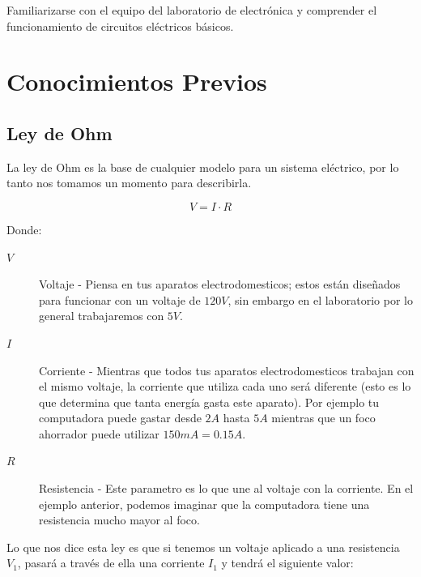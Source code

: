 	Familiarizarse con el equipo del laboratorio de electrónica y comprender el funcionamiento de circuitos eléctricos básicos.


\section{Conocimientos Previos}


	\subsection{Ley de Ohm}

		La ley de Ohm es la base de cualquier modelo para un sistema eléctrico, por lo tanto nos tomamos un momento para describirla.

		\begin{equation}
			V = I \cdot R
		\end{equation}

		Donde:

		\begin{description}
			\item[$V$] Voltaje - Piensa en tus aparatos electrodomesticos; estos están diseñados para funcionar con un voltaje de $120 V$, sin embargo en el laboratorio por lo general trabajaremos con $5 V$.
			\item[$I$] Corriente - Mientras que todos tus aparatos electrodomesticos trabajan con el mismo voltaje, la corriente que utiliza cada uno será diferente (esto es lo que determina que tanta energía gasta este aparato). Por ejemplo tu computadora puede gastar desde $2 A$ hasta $5 A$ mientras que un foco ahorrador puede utilizar $150 mA = 0.15 A$.
			\item[$R$] Resistencia - Este parametro es lo que une al voltaje con la corriente. En el ejemplo anterior, podemos imaginar que la computadora tiene una resistencia mucho mayor al foco.
		\end{description}

		Lo que nos dice esta ley es que si tenemos un voltaje aplicado a una resistencia $V_1$, pasará a través de ella una corriente $I_1$ y tendrá el siguiente valor:

